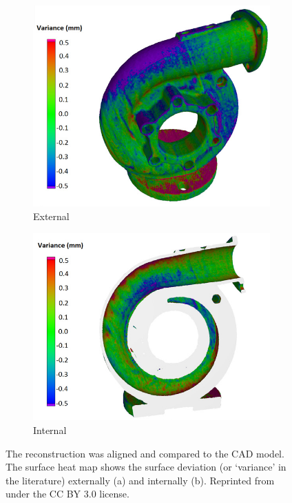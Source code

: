 \begin{figure}
  \centering
      \begin{subfigure}[b]{0.49\textwidth}
      \includegraphics[width=\textwidth]{../figures/literatureReview/literature_warnett1.png}
      \caption{External}
    \end{subfigure}
    \begin{subfigure}[b]{0.49\textwidth}
      \includegraphics[width=\textwidth]{../figures/literatureReview/literature_warnett2.png}
      \caption{Internal}
    \end{subfigure}
    \caption{The reconstruction was aligned and compared to the CAD model. The surface heat map shows the surface deviation (or `variance' in the literature) externally (a) and internally (b). Reprinted from \cite{warnett2016towards} under the CC BY 3.0 license.}
    \label{fig:literature_warnett}
\end{figure}

